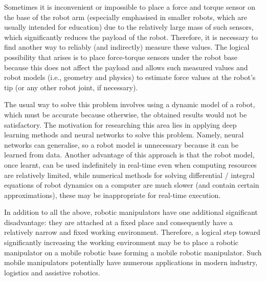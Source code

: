 Sometimes it is inconvenient or impossible to place a force and torque sensor on the base of the robot arm (especially emphasised in smaller robots, which are usually intended for education) due to the relatively large mass of such sensors, which significantly reduces the payload of the robot. Therefore, it is necessary to find another way to reliably (and indirectly) measure these values. The logical possibility that arises is to place force-torque sensors under the robot base because this does not affect the payload and allows such measured values and robot models (i.e., geometry and physics) to estimate force values at the robot's tip (or any other robot joint, if necessary).

The usual way to solve this problem involves using a dynamic model of a robot, which must be accurate because otherwise, the obtained results would not be satisfactory. 
The motivation for researching this area lies in applying deep learning methods and neural networks to solve this problem. Namely, neural networks can generalise, so a robot model is unnecessary because it can be learned from data. Another advantage of this approach is that the robot model, once learnt, can be used indefinitely in real-time even when computing resources are relatively limited, while numerical methods for solving differential / integral equations of robot dynamics on a computer are much slower (and contain certain approximations), these may be inappropriate for real-time execution.

In addition to all the above, robotic manipulators have one additional significant disadvantage: they are attached at a fixed place and consequently have a relatively narrow and fixed working environment. Therefore, a logical step toward significantly increasing the working environment may be to place a robotic manipulator on a mobile robotic base forming a mobile robotic manipulator. Such mobile manipulators potentially have numerous applications in modern industry, logistics and assistive robotics.

